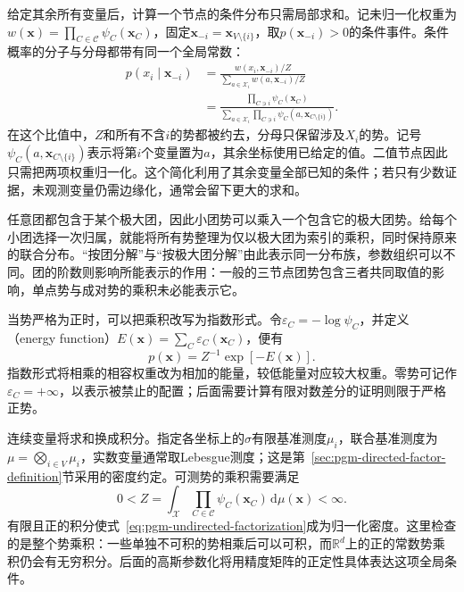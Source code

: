 给定其余所有变量后，计算一个节点的条件分布只需局部求和。记未归一化权重为$w(\bm{x})=\prod_{C\in\mathcal C}\psi_C(\bm{x}_C)$，固定$\bm{x}_{-i}=\bm{x}_{V\setminus\{i\}}$，取$p(\bm{x}_{-i})>0$的条件事件。条件概率的分子与分母都带有同一个全局常数：
\begin{equation}
  \begin{aligned}
    p(x_i\mid\bm{x}_{-i})
      &=\frac{w(x_i,\bm{x}_{-i})/Z}
        {\sum_{a\in\mathcal X_i}w(a,\bm{x}_{-i})/Z}\\
      &=\frac{\prod_{C\ni i}\psi_C(\bm{x}_C)}
        {\sum_{a\in\mathcal X_i}
          \prod_{C\ni i}\psi_C(a,\bm{x}_{C\setminus\{i\}})}.
  \end{aligned}
  \label{eq:pgm-undirected-local-conditional}
\end{equation}
在这个比值中，$Z$和所有不含$i$的势都被约去，分母只保留涉及$X_i$的势。记号$\psi_C(a,\bm{x}_{C\setminus\{i\}})$表示将第$i$个变量置为$a$，其余坐标使用已给定的值。二值节点因此只需把两项权重归一化。这个简化利用了其余变量全部已知的条件；若只有少数证据，未观测变量仍需边缘化，通常会留下更大的求和。

任意团都包含于某个极大团，因此小团势可以乘入一个包含它的极大团势。给每个小团选择一次归属，就能将所有势整理为仅以极大团为索引的乘积，同时保持原来的联合分布。“按团分解”与“按极大团分解”由此表示同一分布族，参数组织可以不同。团的阶数则影响所能表示的作用：一般的三节点团势包含三者共同取值的影响，单点势与成对势的乘积未必能表示它。

当势严格为正时，可以把乘积改写为指数形式。令$\varepsilon_C=-\log\psi_C$，并定义（energy function）$E(\bm{x})=\sum_C\varepsilon_C(\bm{x}_C)$，便有
\[
  p(\bm{x})=Z^{-1}\exp[-E(\bm{x})].
\]
指数形式将相乘的相容权重改为相加的能量，较低能量对应较大权重。零势可记作$\varepsilon_C=+\infty$，以表示被禁止的配置；后面需要计算有限对数差分的证明则限于严格正势。

连续变量将求和换成积分。指定各坐标上的$\sigma$有限基准测度$\mu_i$，联合基准测度为$\mu=\bigotimes_{i\in V}\mu_i$，实数变量通常取Lebesgue测度；这是第~\ref{sec:pgm-directed-factor-definition}节采用的密度约定。可测势的乘积需要满足
\begin{equation}
  0<Z=\int_{\mathcal{X}}\prod_{C\in\mathcal{C}}
       \psi_C(\bm{x}_C)\,\mathrm{d}\mu(\bm{x})<\infty.
  \label{eq:pgm-undirected-continuous-partition}
\end{equation}
有限且正的积分使式~\eqref{eq:pgm-undirected-factorization}成为归一化密度。这里检查的是整个势乘积：一些单独不可积的势相乘后可以可积，而$\mathbb{R}^d$上的正的常数势乘积仍会有无穷积分。后面的高斯参数化将用精度矩阵的正定性具体表达这项全局条件。

